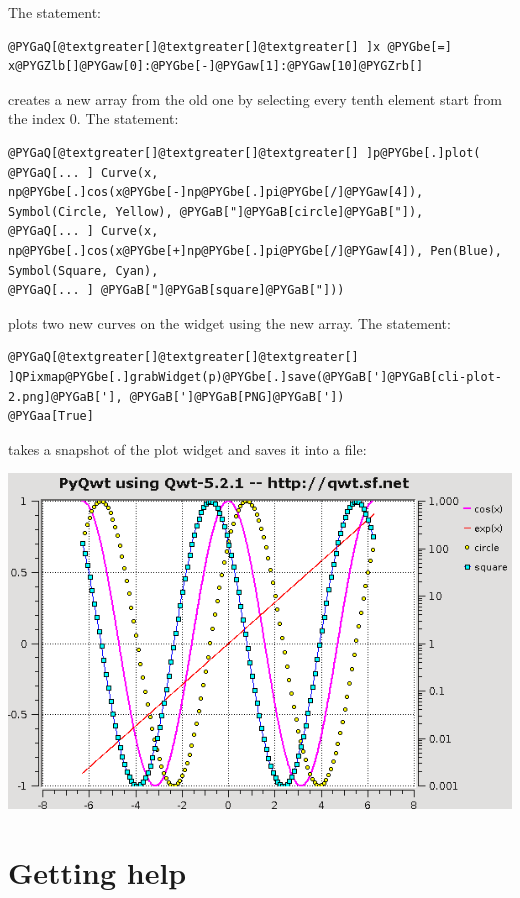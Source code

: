 \documentclass[a4paper,10pt,english]{manual}
\begin{document}
The statement:

\begin{Verbatim}[commandchars=@\[\]]
@PYGaQ[@textgreater[]@textgreater[]@textgreater[] ]x @PYGbe[=] x@PYGZlb[]@PYGaw[0]:@PYGbe[-]@PYGaw[1]:@PYGaw[10]@PYGZrb[]
\end{Verbatim}

creates a new array from the old one by selecting every tenth element
start from the index 0.
The statement:

\begin{Verbatim}[commandchars=@\[\]]
@PYGaQ[@textgreater[]@textgreater[]@textgreater[] ]p@PYGbe[.]plot(
@PYGaQ[... ] Curve(x, np@PYGbe[.]cos(x@PYGbe[-]np@PYGbe[.]pi@PYGbe[/]@PYGaw[4]), Symbol(Circle, Yellow), @PYGaB["]@PYGaB[circle]@PYGaB["]),
@PYGaQ[... ] Curve(x, np@PYGbe[.]cos(x@PYGbe[+]np@PYGbe[.]pi@PYGbe[/]@PYGaw[4]), Pen(Blue), Symbol(Square, Cyan),
@PYGaQ[... ] @PYGaB["]@PYGaB[square]@PYGaB["]))
\end{Verbatim}

plots two new curves on the widget using the new array.
The statement:

\begin{Verbatim}[commandchars=@\[\]]
@PYGaQ[@textgreater[]@textgreater[]@textgreater[] ]QPixmap@PYGbe[.]grabWidget(p)@PYGbe[.]save(@PYGaB[']@PYGaB[cli-plot-2.png]@PYGaB['], @PYGaB[']@PYGaB[PNG]@PYGaB['])
@PYGaa[True]
\end{Verbatim}

takes a snapshot of the plot widget and saves it into a file:

\includegraphics{cli-plot-2.png}
\hypertarget{getting-help}{}

\section{Getting help}
\end{document}
